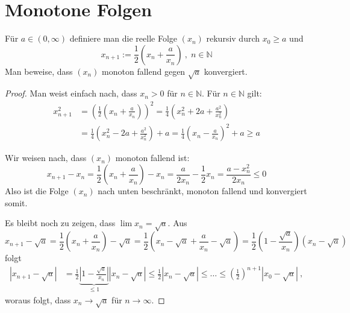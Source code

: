 \section{Monotone Folgen}

\setcounter{aufgabe}{3}
\begin{aufgabe}
Für $a \in (0, \infty)$ definiere man die reelle Folge $(x_n)$ rekursiv durch $x_0 \geq a$ und
\[
x_{n+1} := \frac 1 2 \left( x_n + \frac{a}{x_n} \right) \ , \; n \in \mathbb N
\]
Man beweise, dass $(x_n)$ monoton fallend gegen $\sqrt{a}$ konvergiert.
\end{aufgabe}
\begin{proof}
Man weist einfach nach, dass $x_n > 0$ für $n \in \mathbb N$.
Für $n \in \mathbb N$ gilt:
\begin{align*}
x_{n+1}^2 &= \left( \frac 1 2 \left( x_n + \frac{a}{x_n} \right) \right)^2
	= \frac 1 4 \left( x_n^2 + 2a + \frac{a^2}{x_n^2} \right) \\
	&= \frac 1 4 \left( x_n^2 - 2a  + \frac{a^2}{x_n^2} \right) + a 
	= \frac 1 4 \left( x_n - \frac{a}{x_n} \right)^2 + a \geq a
\end{align*}

Wir weisen nach, dass $(x_n)$ monoton fallend ist:
\[
x_{n+1} - x_n = \frac 1 2 \left( x_n + \frac{a}{x_n} \right) - x_n
	= \frac{a}{2x_n} - \frac 1 2 x_n = \frac{a - x_n^2}{2 x_n} \leq 0
\]
Also ist die Folge $(x_n)$ nach unten beschränkt, monoton fallend und konvergiert somit.

Es bleibt noch zu zeigen, dass $\lim x_n = \sqrt{a}$.
Aus 
\[
x_{n+1} - \sqrt{a}
	= \frac 1 2 \left( x_n + \frac{a}{x_n} \right) - \sqrt{a}
	= \frac 1 2 \left( x_n - \sqrt{a} + \frac{a}{x_n} - \sqrt{a} \right)
	= \frac 1 2 \left( 1 - \frac{\sqrt{a}}{x_n} \right) \left( x_n - \sqrt{a} \right)
\]
folgt
\begin{align*}
| x_{n+1} - \sqrt{a} |
	&= \frac 1 2 \underbrace{ \left| 1 - \frac{\sqrt{a}}{x_n} \right| }_{\leq 1}
	\left| x_n - \sqrt{a} \right|
	\leq \frac 1 2 | x_n - \sqrt{a} |
	\leq \ldots \leq \left( \frac 1 2 \right)^{n+1} | x_0 - \sqrt{a} | \ ,
\end{align*}
woraus folgt, dass $x_n \to \sqrt{a}$ für $n \to \infty$.

\end{proof}


